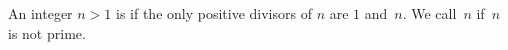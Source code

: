 



\begin{definition}\label{defn:prime_composite}
An integer $n>1$ is  if the only positive
divisors of $n$ are $1$ and~$n$.
We call~$n$  if~$n$ is not prime.
\end{definition}


